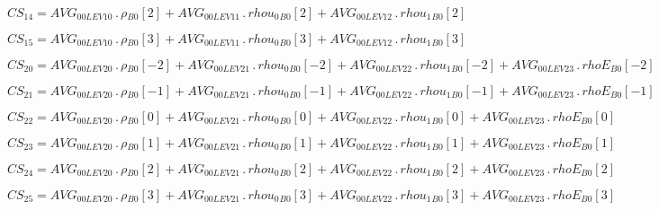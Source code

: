 \documentclass{article}
\begin{document}
\begin{dmath}CS_{14} = AVG_{0 0 LEV 10} \,.\, {\rho{_{B0}}}[{2}] + AVG_{0 0 LEV 11} \,.\, {rhou_{0}{_{B0}}}[{2}] + AVG_{0 0 LEV 12} \,.\, {rhou_{1}{_{B0}}}[{2}]\end{dmath}

\begin{dmath}CS_{15} = AVG_{0 0 LEV 10} \,.\, {\rho{_{B0}}}[{3}] + AVG_{0 0 LEV 11} \,.\, {rhou_{0}{_{B0}}}[{3}] + AVG_{0 0 LEV 12} \,.\, {rhou_{1}{_{B0}}}[{3}]\end{dmath}

\begin{dmath}CS_{20} = AVG_{0 0 LEV 20} \,.\, {\rho{_{B0}}}[{-2}] + AVG_{0 0 LEV 21} \,.\, {rhou_{0}{_{B0}}}[{-2}] + AVG_{0 0 LEV 22} \,.\, {rhou_{1}{_{B0}}}[{-2}] + AVG_{0 0 LEV 23} \,.\, {rhoE{_{B0}}}[{-2}]\end{dmath}

\begin{dmath}CS_{21} = AVG_{0 0 LEV 20} \,.\, {\rho{_{B0}}}[{-1}] + AVG_{0 0 LEV 21} \,.\, {rhou_{0}{_{B0}}}[{-1}] + AVG_{0 0 LEV 22} \,.\, {rhou_{1}{_{B0}}}[{-1}] + AVG_{0 0 LEV 23} \,.\, {rhoE{_{B0}}}[{-1}]\end{dmath}

\begin{dmath}CS_{22} = AVG_{0 0 LEV 20} \,.\, {\rho{_{B0}}}[{0}] + AVG_{0 0 LEV 21} \,.\, {rhou_{0}{_{B0}}}[{0}] + AVG_{0 0 LEV 22} \,.\, {rhou_{1}{_{B0}}}[{0}] + AVG_{0 0 LEV 23} \,.\, {rhoE{_{B0}}}[{0}]\end{dmath}

\begin{dmath}CS_{23} = AVG_{0 0 LEV 20} \,.\, {\rho{_{B0}}}[{1}] + AVG_{0 0 LEV 21} \,.\, {rhou_{0}{_{B0}}}[{1}] + AVG_{0 0 LEV 22} \,.\, {rhou_{1}{_{B0}}}[{1}] + AVG_{0 0 LEV 23} \,.\, {rhoE{_{B0}}}[{1}]\end{dmath}

\begin{dmath}CS_{24} = AVG_{0 0 LEV 20} \,.\, {\rho{_{B0}}}[{2}] + AVG_{0 0 LEV 21} \,.\, {rhou_{0}{_{B0}}}[{2}] + AVG_{0 0 LEV 22} \,.\, {rhou_{1}{_{B0}}}[{2}] + AVG_{0 0 LEV 23} \,.\, {rhoE{_{B0}}}[{2}]\end{dmath}

\begin{dmath}CS_{25} = AVG_{0 0 LEV 20} \,.\, {\rho{_{B0}}}[{3}] + AVG_{0 0 LEV 21} \,.\, {rhou_{0}{_{B0}}}[{3}] + AVG_{0 0 LEV 22} \,.\, {rhou_{1}{_{B0}}}[{3}] + AVG_{0 0 LEV 23} \,.\, {rhoE{_{B0}}}[{3}]\end{dmath}
\end{document}
